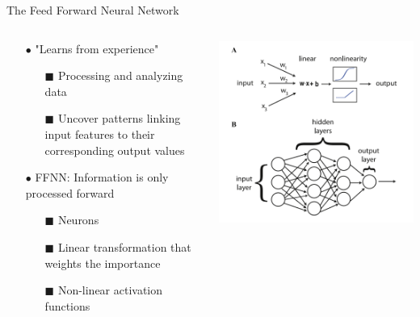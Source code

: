 \documentclass[aspectratio=169]{beamer}
\begin{document}
\begin{frame}{The Feed Forward Neural Network}
    \begin{columns}
        \begin{column}{0.5\textwidth}
            \begin{itemize}
                \item[$\bullet$] "Learns from experience"
                \begin{itemize}
                    \item[\tiny$\blacksquare$] Processing and analyzing data
                    \item[\tiny$\blacksquare$] Uncover patterns linking input features to their corresponding output values
                \end{itemize}
                \item[$\bullet$] FFNN: Information is only processed forward
                \begin{itemize}
                    \item[\tiny$\blacksquare$] Neurons
                    \item[\tiny$\blacksquare$] Linear transformation that weights the importance
                    \item[\tiny$\blacksquare$] Non-linear activation functions
                \end{itemize}
            \end{itemize}
        \end{column}
        \begin{column}{0.5\textwidth}
            \includegraphics[width=\textwidth]{figures/basic_architecture.png}
        \end{column}
    \end{columns}
\end{frame}
\end{document}
